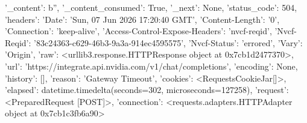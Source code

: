 
{'_content': b'', '_content_consumed': True, '_next': None, 'status_code': 504, 'headers': {'Date': 'Sun, 07 Jun 2026 17:20:40 GMT', 'Content-Length': '0', 'Connection': 'keep-alive', 'Access-Control-Expose-Headers': 'nvcf-reqid', 'Nvcf-Reqid': '83c24363-c629-46b3-9a3a-914ec4595575', 'Nvcf-Status': 'errored', 'Vary': 'Origin'}, 'raw': <urllib3.response.HTTPResponse object at 0x7cb1d2477370>, 'url': 'https://integrate.api.nvidia.com/v1/chat/completions', 'encoding': None, 'history': [], 'reason': 'Gateway Timeout', 'cookies': <RequestsCookieJar[]>, 'elapsed': datetime.timedelta(seconds=302, microseconds=127258), 'request': <PreparedRequest [POST]>, 'connection': <requests.adapters.HTTPAdapter object at 0x7cb1c3fb6a90>}
